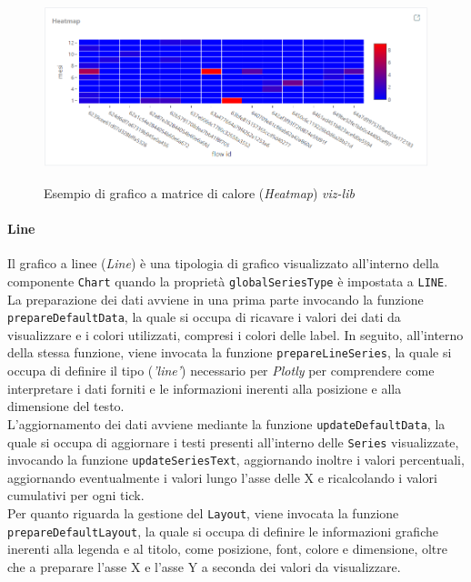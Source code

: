 \begin{figure}[H]
    \centering
    \includegraphics[alt={Esempio di grafico a matrice di calore viz-lib}, width=1 \columnwidth, height=\maxdimen, keepaspectratio]{img/ex_heatmap.png}
    \caption{Esempio di grafico a matrice di calore (\textit{Heatmap}) \textit{viz-lib}}
    \label{fig:heatmap-example}
\end{figure}

\paragraph{Line}
Il grafico a linee (\textit{Line}) è una tipologia di grafico visualizzato all'interno della componente \texttt{Chart} quando la proprietà \texttt{globalSeriesType} è impostata a \texttt{LINE}. \\
La preparazione dei dati avviene in una prima parte invocando la funzione \\
\texttt{prepareDefaultData}, la quale si occupa di ricavare i valori dei dati da visualizzare e i colori utilizzati, compresi i
colori delle label. In seguito, all'interno della stessa funzione, viene invocata la funzione \texttt{prepareLineSeries}, la quale si occupa di definire il tipo (\textit{'line'}) necessario per \textit{Plotly}
per comprendere come interpretare i dati forniti e le informazioni inerenti alla posizione e alla dimensione del testo. \\
L'aggiornamento dei dati avviene mediante la funzione \texttt{updateDefaultData}, la quale si occupa di aggiornare i testi presenti all'interno delle \texttt{Series} visualizzate, invocando la funzione
\texttt{updateSeriesText}, aggiornando inoltre i valori percentuali, aggiornando eventualmente i valori lungo l'asse delle X e ricalcolando i valori cumulativi per ogni tick. \\
Per quanto riguarda la gestione del \texttt{Layout}, viene invocata la funzione \\
\texttt{prepareDefaultLayout}, la quale si occupa di definire le informazioni grafiche inerenti alla legenda e al titolo, come posizione,
font, colore e dimensione, oltre che a preparare l'asse X e l'asse Y a seconda dei valori da visualizzare.

